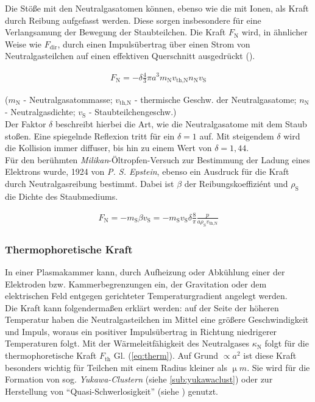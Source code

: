 \documentclass[numbers=noenddot,a4paper]{scrartcl}
\newcommand{\ix}[1]{_\text{#1}}
\newcommand{\tilt}[1]{\textit{#1}}
\begin{document}
			Die Stöße mit den Neutralgasatomen können, ebenso wie die mit Ionen, als Kraft durch Reibung aufgefasst werden. Diese sorgen insbesondere für eine Verlangsamung der Bewegung der Staubteilchen. Die Kraft $F\ix{N}$ wird, in ähnlicher Weise wie $F\ix{dir}$, durch einen Impulsübertrag über einen Strom von Neutralgasteilchen auf einen effektiven Querschnitt ausgedrückt (\cite{Epstein24}).

				\begin{align}
					F\ix{N}=-\delta\frac{4}{3}\pi a^3m\ix{N}v\ix{th,N}n\ix{N}v\ix{S}
				\end{align}

			($m\ix{N}$ - Neutralgasatommasse; $v\ix{th,N}$ - thermische Geschw. der Neutralgasatome; $n\ix{N}$ - Neutralgasdichte; $v\ix{S}$ - Staubteilchengeschw.)\\
			Der Faktor $\delta$ beschreibt hierbei die Art, wie die Neutralgasatome mit dem Staub stoßen. Eine spiegelnde Reflexion tritt für ein $\delta=1$ auf. Mit steigendem $\delta$ wird die Kollision immer diffuser, bis hin zu einem Wert von $\delta=1,44$.\\
			Für den berühmten \tilt{Milikan}-Öltropfen-Versuch zur Bestimmung der Ladung eines Elektrons wurde, 1924 von \tilt{P. S. Epstein}, ebenso ein Ausdruck für die Kraft durch Neutralgasreibung bestimmt. Dabei ist $\beta$ der Reibungskoeffiziént und $\rho\ix{S}$ die Dichte des Staubmediums.

				\begin{align}
					F\ix{N}=-m\ix{S}\beta v\ix{S}=-m\ix{S}v\ix{S}\delta\frac{8}{\pi}\frac{p}{a\rho\ix{S}v\ix{th,N}}
				\end{align}

		\subsubsection{Thermophoretische Kraft}\label{subsub:therm}

			In einer Plasmakammer kann, durch Aufheizung oder Abkühlung einer der Elektroden bzw. Kammerbegrenzungen ein, der Gravitation oder dem elektrischen Feld entgegen gerichteter Temperaturgradient angelegt werden.\\
			Die Kraft kann folgendermaßen erklärt werden: auf der Seite der höheren Temperatur haben die Neutralgasteilchen im Mittel eine größere Geschwindigkeit und Impuls, woraus ein positiver Impulsübertrag in Richtung niedrigerer Temperaturen folgt.	Mit der Wärmeleitfähigkeit des Neutralgases $\kappa\ix{N}$ folgt für die thermophoretische Kraft $F\ix{th}$ Gl. (\ref{eq:therm}). Auf Grund $\propto a^2$ ist diese Kraft besonders wichtig für Teilchen mit einem Radius kleiner als $\unit{\upmu m}$. Sie wird für die Formation von sog. \tilt{Yukawa-Clustern} (siehe \ref{sub:yukawaclust}) oder zur Herstellung von "`Quasi-Schwerlosigkeit"' (siehe \cite{Rothermel02}) genutzt.
\end{document}
